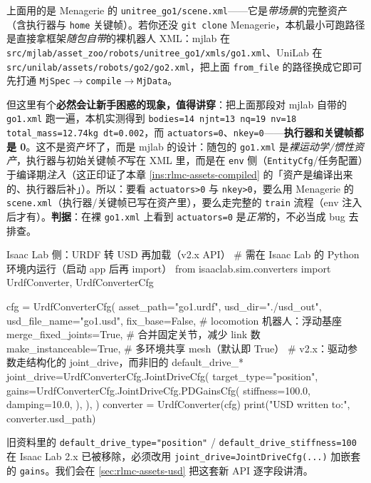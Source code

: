 \begin{note}\label{note:rlmc-assets-bareasset}
上面用的是 Menagerie 的 \texttt{unitree\_go1/scene.xml}——它是\emph{带场景}的完整资产（含执行器与 \texttt{home} 关键帧）。若你还没 \texttt{git clone} Menagerie，本机最小可跑路径是直接拿框架\emph{随包自带}的裸机器人 XML：mjlab 在 \verb|src/mjlab/asset_zoo/robots/unitree_go1/xmls/go1.xml|、UniLab 在 \verb|src/unilab/assets/robots/go2/go2.xml|，把上面 \texttt{from\_file} 的路径换成它即可先打通 \texttt{MjSpec$\to$compile$\to$MjData}。

但这里有个\textbf{必然会让新手困惑的现象，值得讲穿}：把上面那段对 mjlab 自带的 \texttt{go1.xml} 跑一遍，本机实测得到 \verb|bodies=14 njnt=13 nq=19 nv=18 total_mass=12.74kg dt=0.002|，而 \verb|actuators=0|、\verb|nkey=0|——\textbf{执行器和关键帧都是 0}。这不是资产坏了，而是 mjlab 的设计：随包的 \texttt{go1.xml} 是\emph{裸运动学/惯性资产}，执行器与初始关键帧\emph{不}写在 XML 里，而是在 \texttt{env} 侧（\texttt{EntityCfg}/任务配置）于编译期\emph{注入}（这正印证了本章 \cref{ins:rlmc-assets-compiled} 的「资产是编译出来的、执行器后补」）。所以：要看 \verb|actuators>0| 与 \verb|nkey>0|，要么用 Menagerie 的 \texttt{scene.xml}（执行器/关键帧已写在资产里），要么走完整的 \texttt{train} 流程（env 注入后才有）。\textbf{判据}：在裸 \texttt{go1.xml} 上看到 \verb|actuators=0| 是\emph{正常}的，不必当成 bug 去排查。
\end{note}

\begin{codebox}[Python]{Isaac Lab 侧：URDF 转 USD 再加载（v2.x API）}
# 需在 Isaac Lab 的 Python 环境内运行（启动 app 后再 import）
from isaaclab.sim.converters import UrdfConverter, UrdfConverterCfg

cfg = UrdfConverterCfg(
    asset_path="go1.urdf",
    usd_dir="./usd_out",
    usd_file_name="go1.usd",
    fix_base=False,                 # locomotion 机器人：浮动基座
    merge_fixed_joints=True,        # 合并固定关节，减少 link 数
    make_instanceable=True,         # 多环境共享 mesh（默认即 True）
    # v2.x：驱动参数走结构化的 joint_drive，而非旧的 default_drive_*
    joint_drive=UrdfConverterCfg.JointDriveCfg(
        target_type="position",
        gains=UrdfConverterCfg.JointDriveCfg.PDGainsCfg(
            stiffness=100.0, damping=10.0,
        ),
    ),
)
converter = UrdfConverter(cfg)
print("USD written to:", converter.usd_path)
\end{codebox}

旧资料里的 \verb|default_drive_type="position"| / \verb|default_drive_stiffness=100| 在 Isaac Lab 2.x 已被移除，必须改用 \verb|joint_drive=JointDriveCfg(...)| 加嵌套的 \verb|gains|。我们会在 \cref{sec:rlmc-assets-usd} 把这套新 API 逐字段讲清。

